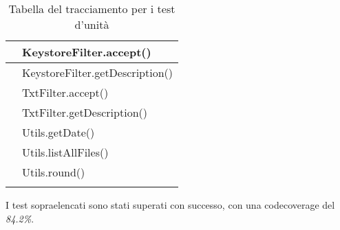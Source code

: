 \begin{center}
\begin{longtable}{ |C{3cm} |C{10.5cm}|}
                     & KeystoreFilter.accept()                    \\\hline
                     & KeystoreFilter.getDescription()            \\\hline
                     & TxtFilter.accept()                         \\\hline
                     & TxtFilter.getDescription()                 \\\hline
                     & Utils.getDate()                            \\\hline
                     & Utils.listAllFiles()                       \\\hline
                     & Utils.round()                              \\\hline
        \caption{Tabella del tracciamento per i test d'unità}
    \end{longtable}
\end{center}

I test sopraelencati sono stati superati con successo, con una \gls{codecoverage} del \textit{84.2\%}.

